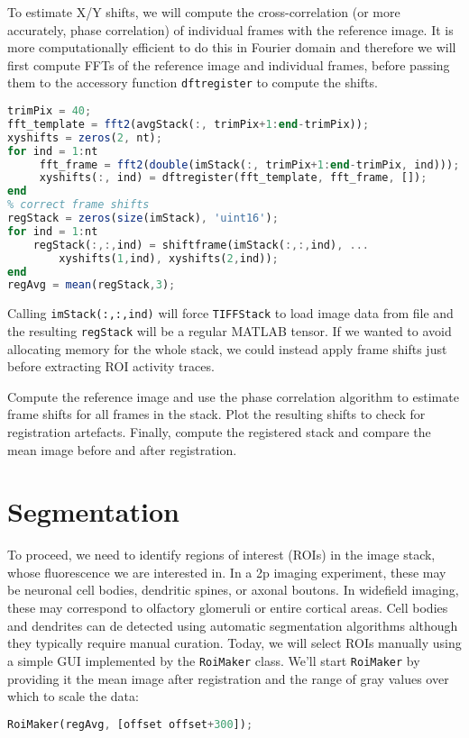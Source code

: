 \documentclass[a4paper]{report}
\newcommand{\nexercise}[0]{\arabic{exercises}\addtocounter{exercises}{1}}
\begin{document}
To estimate X/Y shifts, we will compute the cross-correlation (or more accurately, phase correlation) of individual frames with the reference image.
It is more computationally efficient to do this in Fourier domain and therefore we will first compute FFTs of the reference image and individual frames, before passing them to the accessory function \texttt{dftregister} to compute the shifts.
\begin{lstlisting}[language=Octave]
% cropping the images to avoid the visual stimulation artefacts on the edge
trimPix = 40;
fft_template = fft2(avgStack(:, trimPix+1:end-trimPix));
xyshifts = zeros(2, nt);
for ind = 1:nt
     fft_frame = fft2(double(imStack(:, trimPix+1:end-trimPix, ind)));
     xyshifts(:, ind) = dftregister(fft_template, fft_frame, []);
end
% correct frame shifts
regStack = zeros(size(imStack), 'uint16');
for ind = 1:nt
    regStack(:,:,ind) = shiftframe(imStack(:,:,ind), ...
        xyshifts(1,ind), xyshifts(2,ind));
end
regAvg = mean(regStack,3);
\end{lstlisting}
Calling \texttt{imStack(:,:,ind)} will force \texttt{TIFFStack} to load image data from file and the resulting \texttt{regStack} will be a regular MATLAB tensor. 
If we wanted to avoid allocating memory for the whole stack, we could instead apply frame shifts just before extracting ROI activity traces.

\begin{exercisebox}[frametitle={Exercise \nexercise: Motion correction}]
Compute the reference image and use the phase correlation algorithm to estimate frame shifts for all frames in the stack.
Plot the resulting shifts to check for registration artefacts.
Finally, compute the registered stack and compare the mean image before and after registration.
\end{exercisebox}

\section{Segmentation}
To proceed, we need to identify regions of interest (ROIs) in the image stack, whose fluorescence we are interested in. 
In a 2p imaging experiment, these may be neuronal cell bodies, dendritic spines, or axonal boutons. 
In widefield imaging, these may correspond to olfactory glomeruli or entire cortical areas.
Cell bodies and dendrites can de detected using automatic segmentation algorithms although they typically require manual curation.
Today, we will select ROIs manually using a simple GUI implemented by the \texttt{RoiMaker} class.
We'll start \texttt{RoiMaker} by providing it the mean image after registration and the range of gray values over which to scale the data:
\begin{lstlisting}[language=Octave]
% select some ROIs using a simple GUI
RoiMaker(regAvg, [offset offset+300]);
\end{lstlisting}
\end{document}
